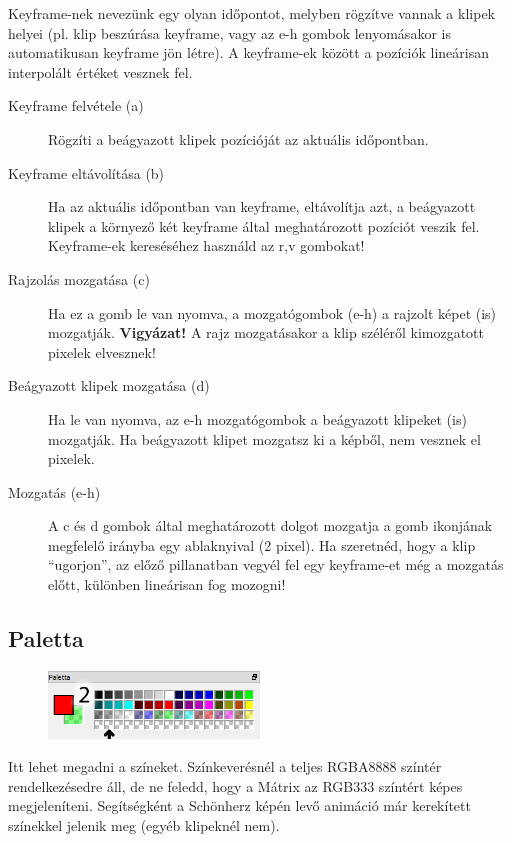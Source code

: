 \documentclass[a4paper,12pt,release]{article}
\begin{document}
Keyframe-nek nevezünk egy olyan időpontot, melyben rögzítve vannak a klipek helyei (pl. klip beszúrása keyframe, vagy az e-h gombok lenyomásakor is automatikusan keyframe jön létre). A keyframe-ek között a pozíciók lineárisan interpolált értéket vesznek fel.
\begin{description}
\item[Keyframe felvétele (a)]{Rögzíti a beágyazott klipek pozícióját az aktuális időpontban.}
\item[Keyframe eltávolítása (b)]{Ha az aktuális időpontban van keyframe, eltávolítja azt, a beágyazott klipek a környező két keyframe által meghatározott pozíciót veszik fel. Keyframe-ek kereséséhez használd az r,v gombokat!}
\item[Rajzolás mozgatása (c)]{Ha ez a gomb le van nyomva, a mozgatógombok (e-h) a rajzolt képet (is) mozgatják. {\bf Vigyázat!} A rajz mozgatásakor a klip széléről kimozgatott pixelek elvesznek!}
\item[Beágyazott klipek mozgatása (d)]{Ha le van nyomva, az e-h mozgatógombok a beágyazott klipeket (is) mozgatják. Ha beágyazott klipet mozgatsz ki a képből, nem vesznek el pixelek.}
\item[Mozgatás (e-h)]{A c és d gombok által meghatározott dolgot mozgatja a gomb ikonjának megfelelő irányba egy ablaknyival (2 pixel). Ha szeretnéd, hogy a klip ``ugorjon'', az előző pillanatban vegyél fel egy keyframe-et még a mozgatás előtt, különben lineárisan fog mozogni!}
\end{description}
\clearpage
\subsection{Paletta}
\begin{figure}
	\vspace{-27pt}
	\begin{center}
		\includegraphics[width=0.5\textwidth]{pics/palette.png}
	\end{center}
	\vspace{-20pt}
\end{figure}
Itt lehet megadni a színeket. Színkeverésnél a teljes RGBA8888 színtér rendelkezésedre áll, de ne feledd, hogy a Mátrix az RGB333 színtért képes megjeleníteni. Segítségként a Schönherz képén levő animáció már kerekített színekkel jelenik meg (egyéb klipeknél nem).
\end{document}
